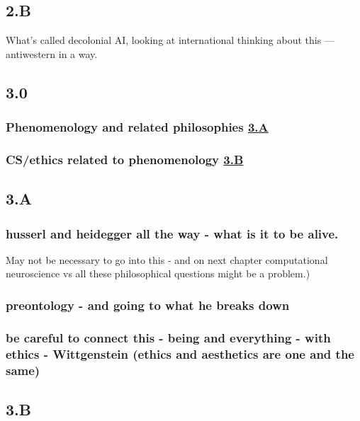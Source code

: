 \documentclass[11pt]{article}
\begin{document}
\subsection{2.B}
\label{sec:orgfaccdba}

What's called decolonial AI, looking at international thinking about
this — antiwestern in a way.
\subsection{3.0}
\label{sec:orgcbc9a7d}

\subsubsection{Phenomenology and related philosophies \hyperref[sec:org8815f23]{3.A}}
\label{sec:org6689ef3}
\subsubsection{CS/ethics related to phenomenology \hyperref[sec:orgd8ccb82]{3.B}}
\label{sec:org41a7111}
\subsection{3.A}
\label{sec:org8815f23}

\subsubsection{husserl and heidegger all the way - what is it to be alive.}
\label{sec:org87bf5a3}
May not be necessary to go into this - and on next chapter computational neuroscience vs all these philosophical questions might be a problem.)
\subsubsection{preontology - and going to what he breaks down}
\label{sec:orge218182}
\subsubsection{be careful to connect this - being and everything - with ethics - Wittgenstein (ethics and aesthetics are one and the same)}
\label{sec:org2111405}

\subsection{3.B}
\label{sec:orgd8ccb82}
\end{document}
